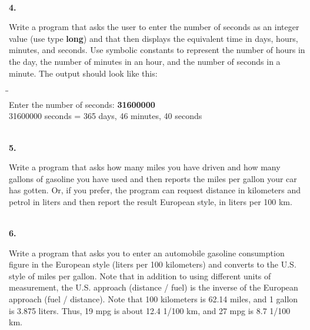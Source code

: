 \documentclass[10 pt]{amsart}
\newlength{\cwidth}
\newenvironment{cpart}[2][\cwidth]
	{\\ \phantom{\qquad}\textbf{#2. }\begin{minipage}[t]{#1}}
	{\end{minipage}}
\begin{document}
	\begin{cpart}{4}
		Write a program that asks the user to enter the number of seconds
		as an integer value (use type \textbf{long}) and that then
		displays the equivalent time in days, hours, minutes, and seconds. 
		Use symbolic constants to represent the number of hours in the day,
		the number of minutes in an hour, and the number of seconds in
		a minute. 
		The output should look like this:
		{\ttfamily
			\begin{tabbing}
				\phantom{\qquad}\=\phantom{\qquad}\=\phantom{\qquad}\= \\
				Enter the number of seconds: {\bf 31600000} \\
				31600000 seconds = 365 days, 46 minutes, 40 seconds
			\end{tabbing}
		}
	\end{cpart}
	\vspace{2ex}

	\begin{cpart}{5}
		Write a program that asks how many miles you have driven and how
		many gallons of gasoline you have used and then reports the
		miles per gallon your car has gotten. 
		Or, if you prefer, the program can request distance in kilometers
		and petrol in liters and then report the result European style,
		in liters per 100 km.
	\end{cpart}
	\vspace{2ex}

	\begin{cpart}{6}
		Write a program that asks you to enter an automobile gasoline
		consumption figure in the European style (liters per 100
		kilometers) and converts to the U.S. style of miles per 
		gallon.
		Note that in addition to using different units of measurement,
		the U.S. approach (distance / fuel) is the inverse of the 
		European approach (fuel / distance).
		Note that 100 kilometers is 62.14 miles, and 1 gallon is 
		3.875 liters.
		Thus, 19 mpg is about 12.4 1/100 km, and 27 mpg is 
		8.7 1/100 km.
	\end{cpart}
	\vspace{2ex}
\end{document}

